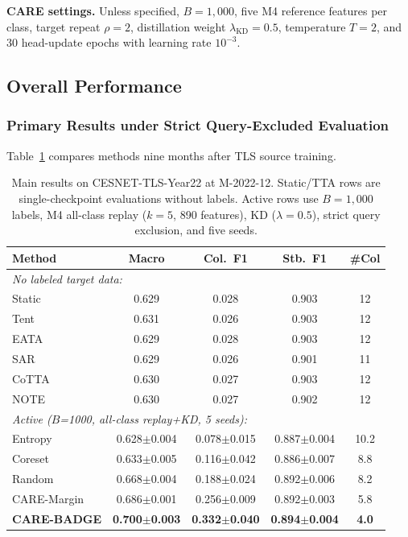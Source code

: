 \documentclass[journal]{IEEEtran}
\newcommand{\ours}{CARE}  %
\begin{document}
\textbf{CARE settings.} Unless specified, $B=1{,}000$, five M4 reference features per class, target repeat $\rho=2$, distillation weight $\lambda_{\mathrm{KD}}=0.5$, temperature $T=2$, and 30 head-update epochs with learning rate $10^{-3}$.

\subsection{Overall Performance}
\label{sec:main_results}


\subsubsection{Primary Results under Strict Query-Excluded Evaluation}
\label{sec:primary_results}
Table~\ref{tab:main_results} compares methods nine months after TLS source training.

\begin{table}[!htbp]
\centering
\caption{Main results on CESNET-TLS-Year22 at M-2022-12. Static/TTA rows are single-checkpoint evaluations without labels. Active rows use $B{=}1{,}000$ labels, M4 all-class replay ($k{=}5$, 890 features), KD ($\lambda{=}0.5$), strict query exclusion, and five seeds.}
\label{tab:main_results}
\scriptsize
\setlength{\tabcolsep}{3pt}
\begin{tabular}{@{}l cccc@{}}
\toprule
Method & Macro & Col.\ F1 & Stb.\ F1 & \#Col \\
\midrule
\multicolumn{5}{l}{\textit{No labeled target data:}} \\
Static          & 0.629 & 0.028 & 0.903 & 12 \\
Tent            & 0.631 & 0.026 & 0.903 & 12 \\
EATA            & 0.629 & 0.028 & 0.903 & 12 \\
SAR             & 0.629 & 0.026 & 0.901 & 11 \\
CoTTA           & 0.630 & 0.027 & 0.903 & 12 \\
NOTE            & 0.630 & 0.027 & 0.902 & 12 \\
\midrule
\multicolumn{5}{l}{\textit{Active ($B$=1000, all-class replay+KD, 5 seeds):}} \\
Entropy         & 0.628$\pm$0.004 & 0.078$\pm$0.015 & 0.887$\pm$0.004 & 10.2 \\
Coreset         & 0.633$\pm$0.005 & 0.116$\pm$0.042 & 0.886$\pm$0.007 & 8.8 \\
Random          & 0.668$\pm$0.004 & 0.188$\pm$0.024 & 0.892$\pm$0.006 & 8.2 \\
\ours{}-Margin  & 0.686$\pm$0.001 & 0.256$\pm$0.009 & 0.892$\pm$0.003 & 5.8 \\
\textbf{\ours{}-BADGE} & \textbf{0.700$\pm$0.003} & \textbf{0.332$\pm$0.040} & \textbf{0.894$\pm$0.004} & \textbf{4.0} \\
\bottomrule
\end{tabular}
\end{table}
\end{document}
